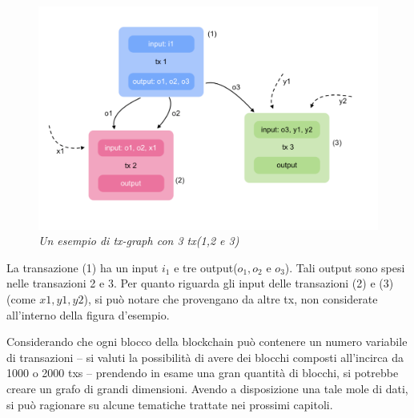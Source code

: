 \begin{figure}[htbp]
	\centering
	\includegraphics[width=\linewidth]{figure/iotxs}
	\caption{\textit{Un esempio di tx-graph con 3 tx(1,2 e 3)} \label{fig:iotxs}}
\end{figure}

La transazione (1) ha un input $i_1$ e tre output($o_1,o_2$ e $o_3$). Tali output sono spesi nelle transazioni 2 e 3. Per quanto riguarda gli input delle transazioni (2) e (3) (come $x1, y1, y2$), si può notare che provengano da altre tx, non considerate all'interno della figura d'esempio. \cite{ddp-ltcbh-17}

Considerando che ogni blocco della blockchain può contenere un numero variabile di transazioni -- si valuti la possibilità di avere dei blocchi composti all'incirca da 1000 o 2000 txs -- prendendo in esame una gran quantità di blocchi, si potrebbe creare un grafo di grandi dimensioni. Avendo a disposizione una tale mole di dati, si può ragionare su alcune tematiche trattate nei prossimi capitoli.

